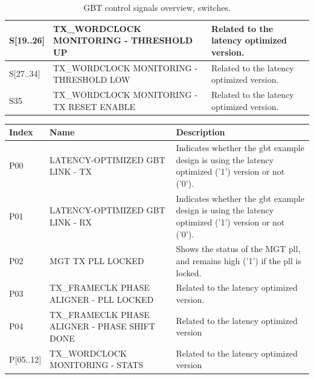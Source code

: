 \documentclass[main.tex]{subfiles}
\begin{document}
\begin{table}[H]
\begin{center}
\begin{tabular}{| l | p{5cm} | p{8cm} |}
  S[19..26]   & TX\_WORDCLOCK MONITORING - THRESHOLD UP         & Related to the latency optimized version.\\ \hline
  S[27..34]   & TX\_WORDCLOCK MONITORING - THRESHOLD LOW        & Related to the latency optimized version.\\ \hline
  S35     & TX\_WORDCLOCK MONITORING - TX RESET ENABLE      & Related to the latency optimized version.\\ \hline
  \end{tabular}
    \caption{GBT control signals overview, switches.}
  \label{tab:switch}  
\end{center}
\end{table}


\begin{table}[H]
\small
\begin{center}
  \begin{tabular}{| l | p{5cm} | p{8cm} |}
  \hline
    Index & Name & Description   \\
    \hline
  P00     & LATENCY-OPTIMIZED GBT LINK - TX   & Indicates whether the \gls{gbt} example design is using the latency optimized ('1') version or not ('0').    \\
  \hline
  P01     & LATENCY-OPTIMIZED GBT LINK - RX   & Indicates whether the \gls{gbt} example design is using the latency optimized ('1') version or not ('0').      \\
  \hline
  P02       & MGT TX PLL LOCKED               & Shows the status of the MGT pll, and remains high ('1') if the pll is locked.  \\    
  \hline
  P03     & TX\_FRAMECLK PHASE ALIGNER - PLL LOCKED     & Related to the latency optimized version. \\     
  \hline
  P04       & TX\_FRAMECLK PHASE ALIGNER - PHASE SHIFT DONE   & Related to the latency optimized version \\    
  \hline
  P[05..12]   & TX\_WORDCLOCK MONITORING - STATS        & Related to the latency optimized version \\    

\end{tabular}
\end{center}
\end{table}
\end{document}
